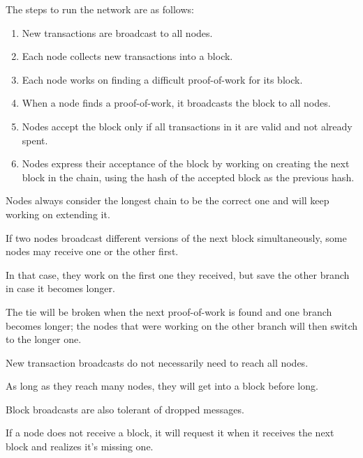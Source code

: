 The steps to run the network are as follows:

\begin{enumerate}
\item New transactions are broadcast to all nodes.
\item Each node collects new transactions into a block.
\item Each node works on finding a difficult proof-of-work for its block.
\item When a node finds a proof-of-work, it broadcasts the block to all nodes.
\item Nodes accept the block only if all transactions in it are valid and not already spent.
\item Nodes express their acceptance of the block by working on creating the next block in the chain, using the hash of the accepted block as the previous hash.
\end{enumerate}

Nodes always consider the longest chain to be the correct one and will keep working on extending it.

If two nodes broadcast different versions of the next block simultaneously, some nodes may receive one or the other first.

In that case, they work on the first one they received, but save the other branch in case it becomes longer.

The tie will be broken when the next proof-of-work is found and one branch becomes longer; the nodes that were working on the other branch will then switch to the longer one.

New transaction broadcasts do not necessarily need to reach all nodes.

As long as they reach many nodes, they will get into a block before long.

Block broadcasts are also tolerant of dropped messages.

If a node does not receive a block, it will request it when it receives the next block and realizes it's missing one.